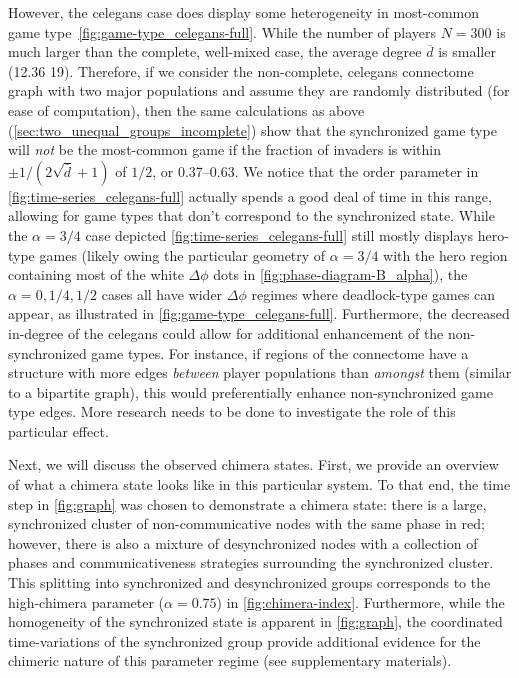 \documentclass[pdflatex,lineno,referee,sn-mathphys-ay]{sn-jnl}
\begin{document}
However, the \gls{celegans} case does display some heterogeneity
in most-common game type~\cref{fig:game-type_celegans-full}.
While the number of players $N = 300$ is much larger
than the complete, well-mixed case,
the average degree $\overline{d}$
is smaller (\num{12.36} \vs \num{19}).
Therefore, if we consider the non-complete, \gls{celegans} connectome graph
with two major populations
and assume they are randomly distributed (for ease of computation),
then the same calculations as above
(\cf \cref{sec:two_unequal_groups_incomplete}) show that
the synchronized game type will \emph{not} be the most-common game
if the fraction of invaders is within
$\pm 1/(2 \sqrt{\overline{d}} + 1)$
of $1/2$, or \numrange{0.37}{0.63}.
We notice that the order parameter in \cref{fig:time-series_celegans-full}
actually spends a good deal of time in this range,
allowing for game types that don't correspond to the synchronized state.
While the $\alpha = 3/4$ case depicted \cref{fig:time-series_celegans-full}
still mostly displays hero-type games
(likely owing the particular geometry of $\alpha = 3/4$
with the hero region containing most of the white $\Delta \phi$ dots
in \cref{fig:phase-diagram-B_alpha}),
the $\alpha = 0, 1/4, 1/2$ cases all have wider $\Delta \phi$ regimes where
deadlock-type games can appear, as illustrated in \cref{fig:game-type_celegans-full}.
Furthermore, the decreased in-degree of the \gls{celegans} could allow
for additional enhancement of the non-synchronized game types.
For instance, if regions of the connectome have a structure with more edges
\emph{between} player populations than \emph{amongst} them
(similar to a bipartite graph),
this would preferentially enhance non-synchronized game type edges.
More research needs to be done to investigate the role of this particular effect.

Next, we will discuss the observed chimera states.
First, we provide an overview of what a chimera state
looks like in this particular system.
To that end, the time step in \cref{fig:graph} was chosen
to demonstrate a chimera state:
there is a large, synchronized cluster
of non-communicative nodes with the same phase in red;
however, there is also a mixture of desynchronized nodes
with a collection of phases and communicativeness strategies
surrounding the synchronized cluster.
This splitting into synchronized and desynchronized groups
corresponds to the high-chimera parameter ($\alpha = 0.75$)
in \cref{fig:chimera-index}.
Furthermore, while the homogeneity of the synchronized state is apparent
in \cref{fig:graph},
the coordinated time-variations of the synchronized group
provide additional evidence for the chimeric nature
of this parameter regime (see supplementary materials).
\end{document}
